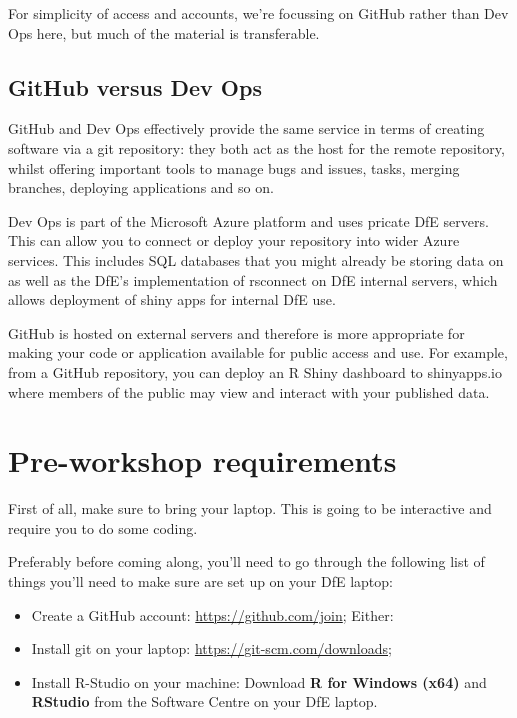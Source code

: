 \documentclass[
  12pt,
]{article}
\begin{document}
For simplicity of access and accounts, we're focussing on GitHub rather
than Dev Ops here, but much of the material is transferable.

\hypertarget{github-versus-dev-ops}{%
\subsection{GitHub versus Dev Ops}\label{github-versus-dev-ops}}

GitHub and Dev Ops effectively provide the same service in terms of
creating software via a git repository: they both act as the host for
the remote repository, whilst offering important tools to manage bugs
and issues, tasks, merging branches, deploying applications and so on.

Dev Ops is part of the Microsoft Azure platform and uses pricate DfE
servers. This can allow you to connect or deploy your repository into
wider Azure services. This includes SQL databases that you might already
be storing data on as well as the DfE's implementation of rsconnect on
DfE internal servers, which allows deployment of shiny apps for internal
DfE use.

GitHub is hosted on external servers and therefore is more appropriate
for making your code or application available for public access and use.
For example, from a GitHub repository, you can deploy an R Shiny
dashboard to shinyapps.io where members of the public may view and
interact with your published data.

\hypertarget{pre-workshop-requirements}{%
\section{Pre-workshop requirements}\label{pre-workshop-requirements}}

First of all, make sure to bring your laptop. This is going to be
interactive and require you to do some coding.

Preferably before coming along, you'll need to go through the following
list of things you'll need to make sure are set up on your DfE laptop:

\begin{itemize}
\item
  Create a GitHub account: \url{https://github.com/join}; Either:
\item
  Install git on your laptop: \url{https://git-scm.com/downloads};
\item
  Install R-Studio on your machine: Download \textbf{R for Windows
  (x64)} and \textbf{RStudio} from the Software Centre on your DfE
  laptop.
\end{itemize}
\end{document}

